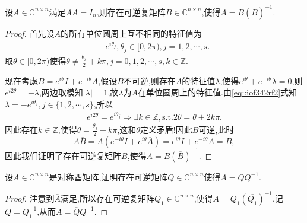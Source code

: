 \documentclass[../../main.tex]{subfiles}
\begin{document}
\begin{theorem}\label{theorem:定理1354846135}
设\( A \in \mathbb{C}^{n \times n} \)满足\( A \overline{A} = I_n \),则存在可逆复矩阵\( B \in \mathbb{C}^{n \times n} \),使得\( A = B (\overline{B})^{-1} \).
\end{theorem}
\begin{proof}
首先设\( A \)的所有单位圆周上互不相同的特征值为
\begin{align}
-e^{i\theta_j}, \theta_j \in [0, 2\pi), j = 1, 2, \cdots, s.\label{eq::iof342rf2}
\end{align}
取\( \theta \in [0, 2\pi) \)使得\( \theta \neq \frac{\theta_j}{2} + k\pi, j = 0, 1, 2, \cdots, s, k \in \mathbb{Z} \).

现在考虑\( B = e^{i\theta} I + e^{-i\theta} A \),假设$B$不可逆,则存在\( A \)的特征值\( \lambda \),使得\( e^{i\theta} + e^{-i\theta} \lambda = 0 \),则\( e^{i2\theta} = -\lambda \),两边取模知$|\lambda|=1$,故$\lambda$为$A$在单位圆周上的特征值.由\eqref{eq::iof342rf2}式知\( \lambda = -e^{i\theta_j}, j \in \{1, 2, \cdots, s\} \),所以
\begin{align}
e^{i2\theta}=e^{i\theta_j}\Longrightarrow \exists k\in \mathbb{Z},\mathrm{s}.\mathrm{t}.  2\theta=\theta + 2k\pi.
\end{align}
因此存在\( k \in \mathbb{Z} \),使得\( \theta = \frac{\theta_j}{2} + k\pi \),这和\( \theta \)定义矛盾!因此\( B \)可逆,此时
\[
A \overline{B} = A \left( e^{-i\theta} I + e^{i\theta} \overline{A} \right) = e^{i\theta} I + e^{-i\theta} A = B,
\]
因此我们证明了存在可逆复矩阵\( B \),使得\( A = B (\overline{B})^{-1} \).

\end{proof}

\begin{proposition}
设\( A \in \mathbb{C}^{n \times n} \)是对称酉矩阵,证明存在可逆矩阵\( Q \in \mathbb{C}^{n \times n} \)使得\( A = \overline{Q} Q^{-1} \).
\end{proposition}
\begin{proof}
注意到\( \overline{A} \)满足,所以存在可逆复矩阵\( Q_1 \in \mathbb{C}^{n \times n} \),使得\( A = Q_1 (\overline{Q_1})^{-1} \),记$Q=Q_1^{-1}$,从而\( A = \overline{Q} Q^{-1} \).

\end{proof}
\end{document}
